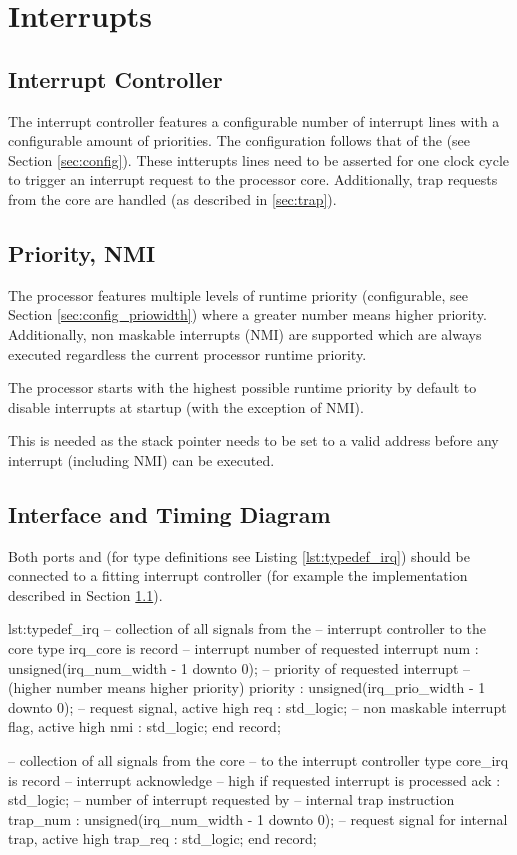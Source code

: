 \chapter{Interrupts}
\section{Interrupt Controller}
\label{sec:irq_ctrl}
The interrupt controller features a configurable number of interrupt lines with a configurable amount of priorities.
The configuration follows that of the \procname (see Section \ref{sec:config}).
These intterupts lines need to be asserted for one clock cycle to trigger an interrupt request to the processor core.
Additionally, trap requests from the core are handled (as described in \ref{sec:trap}).

\section{Priority, NMI}
\label{sec:nmi}
The processor features multiple levels of runtime priority (configurable, see Section \ref{sec:config_priowidth}) where a greater number means higher priority.
Additionally, non maskable interrupts (NMI) are supported which are always executed regardless the current processor runtime priority.

The processor starts with the highest possible runtime priority by default to disable interrupts at startup (with the exception of NMI).

This is needed as the stack pointer needs to be set to a valid address before any interrupt (including NMI) can be executed.

\section{Interface and Timing Diagram}
Both ports  and  (for type definitions see Listing \ref{lst:typedef_irq}) should be connected to a fitting interrupt controller (for example the implementation described in Section \ref{sec:irq_ctrl}).

\begin{vhdl}{lst:typedef_irq}
-- collection of all signals from the
-- interrupt controller to the core
type irq_core is record
	-- interrupt number of requested interrupt
	num      : unsigned(irq_num_width - 1 downto 0);
	-- priority of requested interrupt
	-- (higher number means higher priority)
	priority : unsigned(irq_prio_width - 1 downto 0);
	-- request signal, active high
	req      : std_logic;
	-- non maskable interrupt flag, active high
	nmi      : std_logic;
end record;

-- collection of all signals from the core
-- to the interrupt controller
type core_irq is record
	-- interrupt acknowledge
	-- high if requested interrupt is processed
	ack      : std_logic;
	-- number of interrupt requested by
	-- internal trap instruction
	trap_num : unsigned(irq_num_width - 1 downto 0);
	-- request signal for internal trap, active high
	trap_req : std_logic;
end record;
\end{vhdl}

